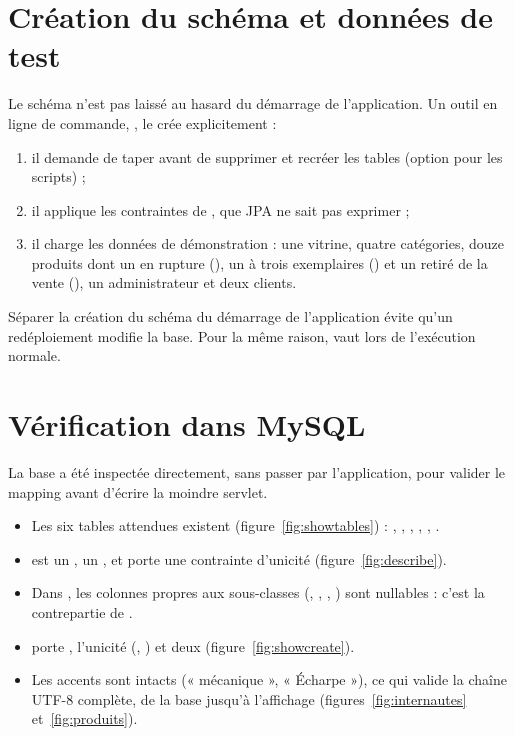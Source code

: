 \section{Création du schéma et données de test}
Le schéma n'est pas laissé au hasard du démarrage de l'application. Un outil en ligne de commande, ,
le crée explicitement :
\begin{enumerate}
  \item il demande de taper  avant de supprimer et recréer les tables (option  pour les scripts) ;
  \item il applique les contraintes  de , que JPA ne sait pas exprimer ;
  \item il charge les données de démonstration : une vitrine, quatre catégories, douze produits dont un en rupture
        (), un à trois exemplaires () et un retiré de la vente (), un administrateur
        et deux clients.
\end{enumerate}
Séparer la création du schéma du démarrage de l'application évite qu'un redéploiement modifie la base. Pour la même
raison,  vaut  lors de l'exécution normale.


\section{Vérification dans MySQL}
La base a été inspectée directement, sans passer par l'application, pour valider le mapping avant d'écrire la
moindre servlet.

\begin{itemize}
  \item Les six tables attendues existent (figure~\ref{fig:showtables}) : , ,
        , , , .
  \item {} est un ,  un , et
         porte une contrainte d'unicité (figure~\ref{fig:describe}).
  \item Dans , les colonnes propres aux sous-classes (, ,
        , ) sont nullables : c'est la contrepartie de .
  \item {} porte , l'unicité (, ) et deux
         (figure~\ref{fig:showcreate}).
  \item Les accents sont intacts (« mécanique », « Écharpe »), ce qui valide la chaîne UTF-8 complète, de la
        base jusqu'à l'affichage (figures~\ref{fig:internautes} et~\ref{fig:produits}).
\end{itemize}

